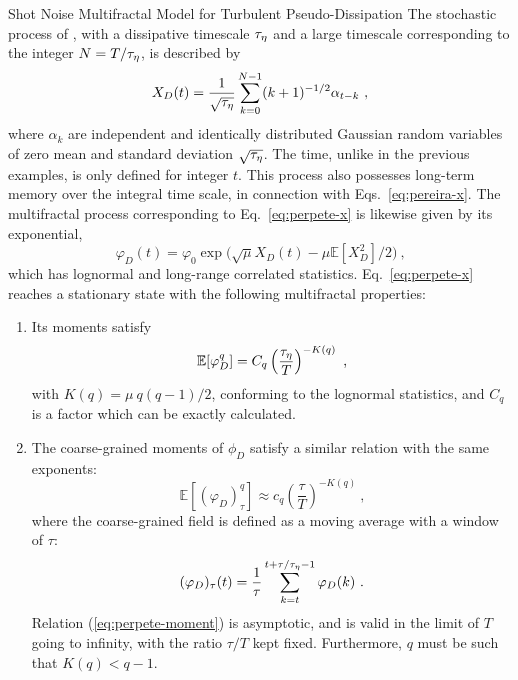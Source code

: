 \begin{chapter}{Shot Noise Multifractal Model for Turbulent Pseudo-Dissipation}
The stochastic process of \textcite{perpete2011}, with a dissipative timescale $\tau_{\eta}$ and a large timescale corresponding to the integer $N = T/\tau_{\eta}$, is described by
\begin{equation} \label{eq:perpete-x}
    X_D(t) = \frac{1}{\sqrt{\tau_{\eta}}} \sum_{k = 0}^{N-1} (k+1)^{-1/2} \alpha_{t-k} \ ,
\end{equation}
where $\alpha_k$ are independent and identically distributed Gaussian random variables of zero mean and standard deviation $\sqrt{\tau_{\eta}}$. The time, unlike in the previous examples, is only defined for integer $t$. This process also possesses long-term memory over the integral time scale, in connection with Eqs.~\eqref{eq:pereira-x}.
The multifractal process corresponding to Eq.~\eqref{eq:perpete-x} is likewise given by its exponential,
\begin{equation}
    \varphi_D(t) = \varphi_0 \exp \big( \sqrt{\mu} X_D(t) - \mu \mathbb{E}[X_D^2]/2 \big) \ \mbox{,}
\end{equation}
which has lognormal and long-range correlated statistics.
Eq.~\eqref{eq:perpete-x} reaches a stationary state with the following multifractal properties:
\begin{enumerate}[label=(\roman*)]
    \item \label{it:bare}
    Its moments satisfy
    \begin{equation} \label{eq:perpete-moments}
    \mathbb{E}[ \varphi_D^q ] =
    C_q \left( \frac{\tau_{\eta}}{T} \right)^{-K(q)} \ \mbox{,}
    \end{equation}
    with $K(q) = \mu \ q (q-1) / 2$, conforming to the lognormal statistics, and $C_q$ is a factor which can be
    exactly calculated.
    \item \label{it:dress}
    The coarse-grained moments of $\phi_D$ satisfy a similar relation with the same exponents:
    \begin{equation} \label{eq:perpete-moment}
    \mathbb{E}[ (\varphi_D)_{\tau}^q ] \approx
    c_q \left( \frac{\tau}{T} \right)^{-K(q)} \ \mbox{,}
    \end{equation}
    where the coarse-grained field is defined as a moving average with a window of $\tau$:
    \begin{equation}
    (\varphi_D)_{\tau}(t) = \frac{1}{\tau} \sum_{k=t}^{t+\tau/\tau_{\eta}-1} \varphi_D(k) \ .
    \end{equation}
    Relation (\ref{eq:perpete-moment}) is asymptotic, and is valid in the limit of $T$ going to infinity, with the ratio $\tau/T$ kept fixed. Furthermore, $q$ must be such that $K(q) < q-1$.

\end{enumerate}
\end{chapter}
